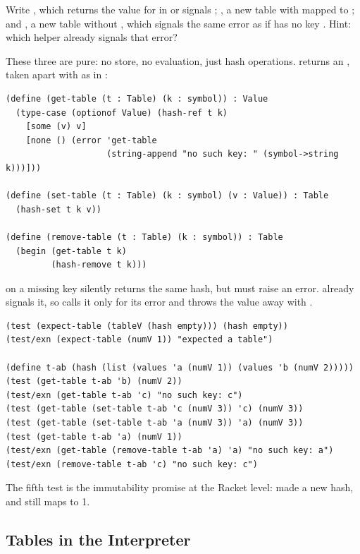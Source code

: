 \begin{exercise}
Write , which returns the value for  in  or signals ; , a new table with  mapped to ; and , a new table without , which signals the same error as  if  has no key . Hint: which helper already signals that error?
\end{exercise}
\begin{solution}
These three are pure: no store, no evaluation, just hash operations.  returns an , taken apart with  as in :
\begin{lstlisting}
(define (get-table (t : Table) (k : symbol)) : Value
  (type-case (optionof Value) (hash-ref t k)
    [some (v) v]
    [none () (error 'get-table
                    (string-append "no such key: " (symbol->string k)))]))

(define (set-table (t : Table) (k : symbol) (v : Value)) : Table
  (hash-set t k v))

(define (remove-table (t : Table) (k : symbol)) : Table
  (begin (get-table t k)
         (hash-remove t k)))
\end{lstlisting}
 on a missing key silently returns the same hash, but  must raise an error.  already signals it, so  calls it only for its error and throws the value away with .
\begin{lstlisting}
(test (expect-table (tableV (hash empty))) (hash empty))
(test/exn (expect-table (numV 1)) "expected a table")

(define t-ab (hash (list (values 'a (numV 1)) (values 'b (numV 2)))))
(test (get-table t-ab 'b) (numV 2))
(test/exn (get-table t-ab 'c) "no such key: c")
(test (get-table (set-table t-ab 'c (numV 3)) 'c) (numV 3))
(test (get-table (set-table t-ab 'a (numV 3)) 'a) (numV 3))
(test (get-table t-ab 'a) (numV 1))
(test/exn (get-table (remove-table t-ab 'a) 'a) "no such key: a")
(test/exn (remove-table t-ab 'c) "no such key: c")
\end{lstlisting}
The fifth test is the immutability promise at the Racket level:  made a new hash, and  still maps  to 1.
\end{solution}

\subsection{Tables in the Interpreter}
\label{sec:rec6-interp}

